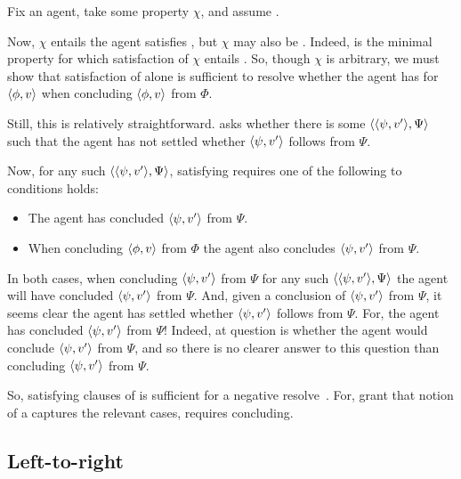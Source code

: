 \begin{note}
  Fix an agent, take some property \(\chi\), and assume .

  Now, \(\chi\) entails the agent satisfies \izetaS{}, but \(\chi\) may also be \zetaS{}.
  Indeed, \zetaS{} is the minimal property for which satisfaction of \(\chi\) entails \zetaS{}.
  So, though \(\chi\) is arbitrary, we must show that satisfaction of \zetaS{} alone is sufficient to resolve whether the agent has \zS{} for \(\langle \phi, v \rangle\) when concluding \(\langle \phi, v \rangle\) from \(\Phi\).

  Still, this is relatively straightforward.
  \qzS{} asks whether there is some \requ{} \(\langle \langle \psi, v' \rangle, \Psi \rangle\) such that the agent has not settled whether \(\langle \psi, v' \rangle\) follows from \(\Psi\).

  Now, for any such \(\langle \langle \psi, v' \rangle, \Psi \rangle\), satisfying \izetaS{} requires one of the following to conditions holds:
  \begin{itemize}
  \item
    The agent has concluded \(\langle \psi, v' \rangle\) from \(\Psi\).
  \item
    When concluding \(\langle \phi, v \rangle\) from \(\Phi\) the agent also concludes \(\langle \psi, v' \rangle\) from \(\Psi\).
  \end{itemize}
  In both cases, when concluding \(\langle \psi, v' \rangle\) from \(\Psi\) for any such \(\langle \langle \psi, v' \rangle, \Psi \rangle\) the agent will have concluded \(\langle \psi, v' \rangle\) from \(\Psi\).
  And, given a conclusion of \(\langle \psi, v' \rangle\) from \(\Psi\), it seems clear the agent has settled whether \(\langle \psi, v' \rangle\) follows from \(\Psi\).
  For, the agent has concluded \(\langle \psi, v' \rangle\) from \(\Psi\)!
  Indeed, at question is whether the agent would conclude \(\langle \psi, v' \rangle\) from \(\Psi\), and so there is no clearer answer to this question than concluding \(\langle \psi, v' \rangle\) from \(\Psi\).

  So, satisfying clauses of \izetaS{} is sufficient for a negative resolve~\qzS{}.
  For, grant that notion of a  captures the relevant cases, \izetaS{} requires concluding.
\end{note}

\subsection{Left-to-right}

